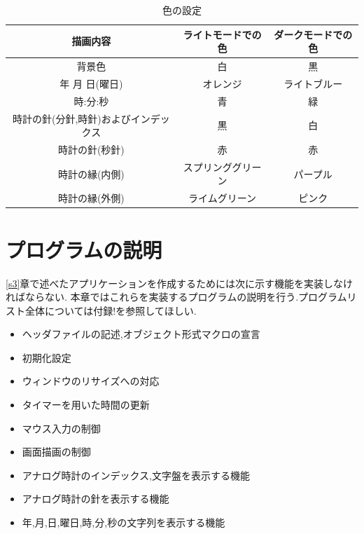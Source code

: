 \documentclass[a4j]{jarticle}
\begin{document}
         \begin{table}[H]
          \caption{色の設定}
        \label{color}
        \begin{center}
            \begin{tabular}{c|c|c}\hline
              描画内容 & ライトモードでの色 & ダークモードでの色 \\ \hline
              背景色 & 白 & 黒 \\
              年 月 日(曜日) &  オレンジ & ライトブルー \\
              時:分:秒 & 青 & 緑 \\
              時計の針(分針,時針)およびインデックス & 黒 & 白 \\
              時計の針(秒針) & 赤 & 赤 \\
              時計の縁(内側) & スプリンググリーン & パープル \\
              時計の縁(外側) & ライムグリーン & ピンク \\ \hline
            \end{tabular}
        \end{center}
        \end{table}

    \section{プログラムの説明}
    \ref{s3}章で述べたアプリケーションを作成するためには次に示す機能を実装しなければならない.
    本章ではこれらを実装するプログラムの説明を行う.プログラムリスト全体については付録!を参照してほしい.
    \begin{itemize}
      \item ヘッダファイルの記述,オブジェクト形式マクロの宣言
      \item 初期化設定
      \item ウィンドウのリサイズへの対応
      \item タイマーを用いた時間の更新
      \item マウス入力の制御
      \item 画面描画の制御
      \item アナログ時計のインデックス,文字盤を表示する機能
      \item アナログ時計の針を表示する機能
      \item 年,月,日,曜日,時,分,秒の文字列を表示する機能 
    \end{itemize}
\end{document}
